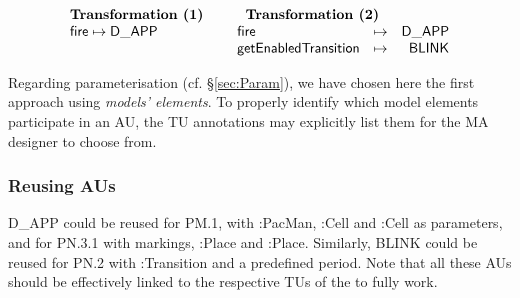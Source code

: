 $$\begin{array}[t]{l}
   \textbf{Transformation (1)}\\
   \mathsf{fire} \mapsto \mathsf{D\_APP}
\end{array}
\hspace{0.5cm}
\begin{array}[t]{lcr}
   \multicolumn{2}{c}{\textbf{Transformation (2)}}\\
	\mathsf{fire} &\mapsto& \mathsf{D\_APP}\\
	\mathsf{getEnabledTransition} &\mapsto& \mathsf{BLINK}	
\end{array}$$

Regarding parameterisation (cf. \S \ref{sec:Param}), we have chosen here
the first approach using \emph{models' elements}. To properly identify which
model elements participate in an AU, the TU annotations may explicitly list them
for the MA designer to choose from.

\subsubsection{Reusing AUs}
\label{sec:Proposal-Reuse}

\textsf{D\_APP} could be reused for \textsf{PM.1}, with \textsf{:PacMan},
\textsf{:Cell} and \textsf{:Cell} as parameters, and for \textsf{PN.3.1}
with \textsf{markings}, \textsf{:Place} and \textsf{:Place}. Similarly,
\textsf{BLINK} could be reused for \textsf{PN.2} with \textsf{:Transition}
and a predefined \textsf{period}. Note that all these AUs should be
effectively linked to the respective TUs of the \DSLs to fully work.
